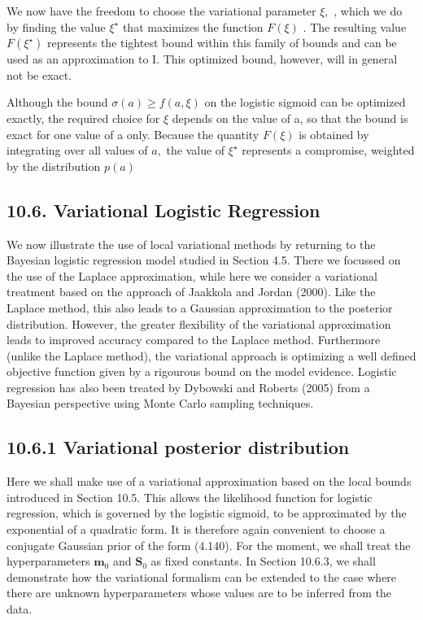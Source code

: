 \documentclass[
  10
]{article}
\begin{document}
We now have the freedom to choose the variational parameter \(\xi ,\) ,
which we do by finding the value \(\xi ^ { \star }\) that maximizes the
function \(F ( \xi )\) . The resulting value \(F ( \xi ^ { \star } )\)
represents the tightest bound within this family of bounds and can be
used as an approximation to I. This optimized bound, however, will in
general not be exact.

Although the bound \(\sigma ( a ) \geqslant f ( a , \xi )\) on the
logistic sigmoid can be optimized exactly, the required choice for
\(\xi\) depends on the value of a, so that the bound is exact for one
value of a only. Because the quantity \(F ( \xi )\) is obtained by
integrating over all values of \(a ,\) the value of \(\xi ^ { \star }\)
represents a compromise, weighted by the distribution \(p ( a )\)

\subsection{10.6. Variational Logistic
Regression}\label{variational-logistic-regression}

We now illustrate the use of local variational methods by returning to
the Bayesian logistic regression model studied in Section 4.5. There we
focussed on the use of the Laplace approximation, while here we consider
a variational treatment based on the approach of Jaakkola and Jordan
(2000). Like the Laplace method, this also leads to a Gaussian
approximation to the posterior distribution. However, the greater
flexibility of the variational approximation leads to improved accuracy
compared to the Laplace method. Furthermore (unlike the Laplace method),
the variational approach is optimizing a well defined objective function
given by a rigourous bound on the model evidence. Logistic regression
has also been treated by Dybowski and Roberts (2005) from a Bayesian
perspective using Monte Carlo sampling techniques.

\subsection{10.6.1 Variational posterior
distribution}\label{variational-posterior-distribution}

Here we shall make use of a variational approximation based on the local
bounds introduced in Section 10.5. This allows the likelihood function
for logistic regression, which is governed by the logistic sigmoid, to
be approximated by the exponential of a quadratic form. It is therefore
again convenient to choose a conjugate Gaussian prior of the form
(4.140). For the moment, we shall treat the hyperparameters
\(\mathbf { m } _ { 0 }\) and \(\mathbf { S } _ { 0 }\) as fixed
constants. In Section 10.6.3, we shall demonstrate how the variational
formalism can be extended to the case where there are unknown
hyperparameters whose values are to be inferred from the data.
\end{document}
